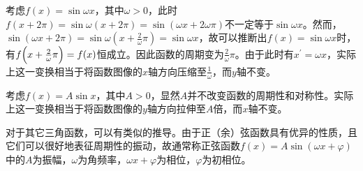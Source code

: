 考虑\(f(x) = \sin \omega x\)，其中\(\omega > 0\)，此时\(f(x + 2 \pi) = \sin \omega \left( x + 2 \pi \right) = \sin \left( \omega x + 2 \omega \pi \right)\)不一定等于\(\sin \omega x\)。然而，\(\sin \left( \omega x + 2 \pi \right) = \sin \omega \left( x + \frac{2}{\omega} \pi \right) = \sin \omega x\)，故可以推断出\(f(x) = \sin \omega x\)时，有\(f\Bigl(x + \frac{2}{\omega} \pi\Bigr) = f(x)\)恒成立。因此函数的周期变为\(\frac{2}{\omega} \pi\)。由于此时有\(x^{'} = \omega x\)，实际上这一变换相当于将函数图像的\(x\)轴方向压缩至\(\frac{1}{\omega}\)，而\(y\)轴不变。

考虑\(f(x) = A \sin x\)，其中\(A > 0\)，显然\(A\)并不改变函数的周期性和对称性。实际上这一变换相当于将函数图像的\(y\)轴方向拉伸至\(A\)倍，而\(x\)轴不变。

对于其它三角函数，可以有类似的推导。由于正（余）弦函数具有优异的性质，且它们可以很好地表征周期性的振动，故通常称正弦函数\(f(x) = A \sin \left( \omega x + \varphi \right)\)中的\(A\)为振幅，\(\omega\)为角频率，\(\omega x+\varphi\)为相位，\(\varphi\)为初相位。
